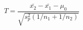 \documentclass[10pt]{article}
\begin{document}
\[T=\frac{\bar{x_2}-\bar{x_1}-\mu_0}{\sqrt{s_p^2(1/n_1+1/n_2)}}\]
\end{document}
